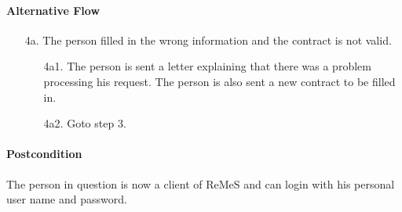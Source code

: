 \paragraph{Alternative Flow}
\begin{enumerate}

	\item[4a.] The person filled in the wrong information and the contract is not valid. 
	\begin{enumerate}
		\item[4a1.] The person is sent a letter explaining that there was a problem processing his request.
				The person is also sent a new contract to be filled in.
		\item[4a2.] Goto step 3. 
	\end{enumerate}
	
\end{enumerate}

\paragraph{Postcondition}
The person in question is now a client of ReMeS and can login with his personal user name and password.
